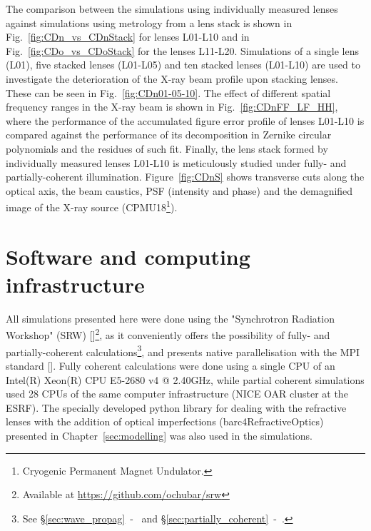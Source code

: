 \begin{refsection}
The comparison between the simulations using individually measured lenses against simulations using metrology from a lens stack is shown in Fig.~\ref{fig:CDn_vs_CDnStack} for lenses L01-L10 and in Fig.~\ref{fig:CDo_vs_CDoStack} for the lenses L11-L20. Simulations of a single lens (L01), five stacked lenses (L01-L05) and ten stacked lenses (L01-L10) are used to investigate the deterioration of the X-ray beam profile upon stacking lenses. These can be seen in Fig.~\ref{fig:CDn01-05-10}. The effect of different spatial frequency ranges in the X-ray beam is shown in Fig.~\ref{fig:CDnFF_LF_HH}, where the performance of the accumulated figure error profile of lenses L01-L10 is compared against the performance of its decomposition in Zernike circular polynomials and the residues of such fit. Finally, the lens stack formed by individually measured lenses L01-L10 is meticulously studied under fully- and partially-coherent illumination. Figure~\ref{fig:CDnS} shows transverse cuts along the optical axis, the beam caustics, PSF (intensity and phase) and the demagnified image of the X-ray source (CPMU18\footnote{Cryogenic Permanent Magnet Undulator.}).

\section{Software and computing infrastructure}\label{sec:SRW}

All simulations presented here were done using the "Synchrotron Radiation Workshop" (SRW) [\cite{Chubar1998}]\footnote{Available at \url{https://github.com/ochubar/srw}}, as it conveniently offers the possibility of fully- and partially-coherent calculations\footnote{See \S\ref{sec:wave_propag}~-~\textit{} and \S\ref{sec:partially_coherent}~-~\textit{}.}, and presents native parallelisation with the MPI standard [\cite{Chubar2011}]. Fully coherent calculations were done using a single CPU of an Intel(R) Xeon(R) CPU E5-2680 v4 @ 2.40GHz, while partial coherent simulations used 28 CPUs of the same computer infrastructure (NICE OAR cluster at the ESRF). The specially developed python library for dealing with the refractive lenses with the addition of optical imperfections (barc4RefractiveOptics) presented in Chapter~\ref{sec:modelling} was also used in the simulations.


\end{refsection}
